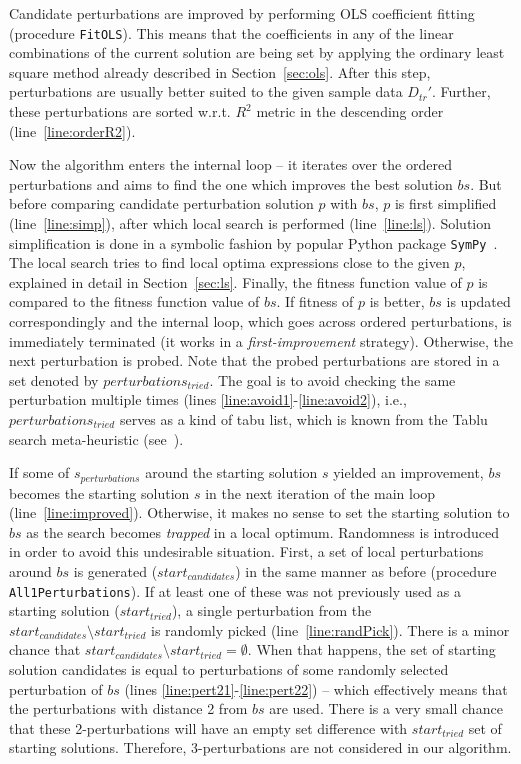 \documentclass{bmcart}
\begin{document}
Candidate perturbations are improved by performing OLS coefficient fitting (procedure \texttt{FitOLS}). This means that the coefficients in any of the linear combinations of the current solution are being set by applying the ordinary least square method already described in Section~\ref{sec:ols}. 
After this step, perturbations are usually better suited to the given sample data $D_{tr}'$. 
Further, these perturbations are sorted w.r.t. $R^2$ metric in the descending order (line~\ref{line:orderR2}). 

Now the algorithm enters the internal loop -- it iterates over the ordered perturbations and aims to find the one which improves the best solution $bs$. But before comparing candidate perturbation solution $p$ with $bs$, $p$ is first simplified (line~\ref{line:simp}), after which local search is performed (line~\ref{line:ls}).
Solution simplification is done in a symbolic fashion by popular  Python package \texttt{SymPy}~\cite{sympy}.
The local search tries to find local optima expressions close to the given $p$, explained in detail in Section~\ref{sec:ls}.  
Finally, the fitness function value of $p$ is compared to the fitness function value of $bs$. If fitness of $p$ is better, $bs$ is updated correspondingly and the internal loop, which goes across ordered perturbations, is immediately terminated (it works in a  \emph{first-improvement} strategy). Otherwise, the next perturbation is probed. 
Note that the probed perturbations are stored in a set denoted by $perturbations_{tried}$. The goal is to avoid checking the same perturbation multiple times (lines \ref{line:avoid1}-\ref{line:avoid2}), i.e., $perturbations_{tried}$ serves as a kind of tabu list, which is known from the Tablu search meta-heuristic (see~\cite{glover1998tabu}).    


If some of $s_{perturbations}$ around the starting solution $s$ yielded an improvement, $bs$ becomes the starting solution $s$ in the next iteration of the main loop (line~\ref{line:improved}). 
Otherwise, it makes no sense to set the starting solution to $bs$ as the search becomes  \emph{trapped} in a local optimum. Randomness is introduced in order to avoid this undesirable situation. First, a set of local perturbations around $bs$ is generated ($start_{candidates}$) in the same manner as before (procedure \texttt{All1Perturbations}). If at least one of these was not previously used as a starting solution ($start_{tried}$), a single perturbation from the $start_{candidates} \setminus start_{tried}$ is randomly picked (line~\ref{line:randPick}). There is a minor chance that $start_{candidates} \setminus start_{tried} = \emptyset$. When that happens, the set of starting solution candidates is equal to perturbations of some randomly selected perturbation of $bs$ (lines \ref{line:pert21}-\ref{line:pert22}) -- which effectively means that the perturbations with distance 2 from $bs$ are used. There is a very small chance that these 2-perturbations will have an empty set difference with $start_{tried}$ set of starting solutions. Therefore, 3-perturbations are not considered in our algorithm. 
\end{document}
